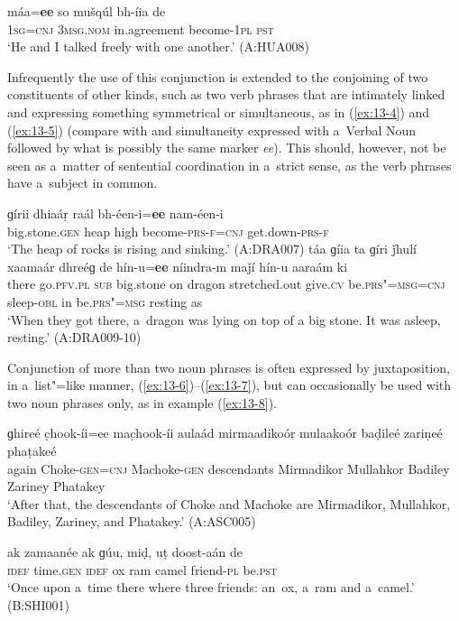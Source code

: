 \ex
\label{ex:13-3}
\gll {\ob}máa=\textbf{ee} so{\cb} mušqúl bh-íia de  \\
\textsc{1sg}=\textsc{cnj} \textsc{3msg.nom} in.agreement become-\textsc{1pl} \textsc{pst} \\
\glt `He and I talked freely with one another.' (A:HUA008) 
\z

Infrequently the use of this conjunction is extended to the conjoining of two constituents of other kinds, such as two verb phrases that are intimately linked and expressing something symmetrical or simultaneous, as in (\ref{ex:13-4}) and (\ref{ex:13-5}) (compare with  and simultaneity expressed with a~Verbal Noun followed by what is possibly the same marker \textit{ee}). This should, however, not be seen as a~matter of sentential coordination in a~strict sense, as the verb phrases have a~subject in common.

\ea
\label{ex:13-4}
\gll ɡírii dhiaáṛ {\ob}raál bh-éen-i=\textbf{ee} nam-éen-i{\cb}  \\
big.stone.\textsc{gen} heap high become-\textsc{prs-f=cnj} get.down-\textsc{prs-f}  \\
\glt `The heap of rocks is rising and sinking.' (A:DRA007) 
\ex
\label{ex:13-5}
\gll táa ɡíia ta ɡíri ǰhulí xaamaár {\ob}dhreéɡ de hín-u=\textbf{ee} níindra-m maǰí hín-u{\cb} aaraám ki\\
there go.\textsc{pfv.pl} \textsc{sub} big.stone on dragon stretched.out  give.\textsc{cv} be.\textsc{prs"=msg=cnj} sleep-\textsc{obl} in be.\textsc{prs"=msg}  resting as\\
\glt `When they got there, a~dragon was lying on top of a big stone. It was asleep, resting.' (A:DRA009-10) 
\z

 Conjunction of more than two noun phrases is often expressed by juxtaposition, in a~list"=like manner, (\ref{ex:13-6})--(\ref{ex:13-7}), but can occasionally be used with two noun phrases only, as in example (\ref{ex:13-8}).

\ea
\label{ex:13-6}
\gll ɡhireé c̣hook-íi=ee mac̣hook-íi aulaád {\ob}mirmaadikoór mulaakoór baḍileé zariṇeé phaṭakeé{\cb}\\
again Choke-\textsc{gen=cnj} Machoke-\textsc{gen} descendants  Mirmadikor Mullahkor Badiley Zariney Phatakey \\
\glt `After that, the descendants of Choke and Machoke are Mirmadikor, Mullahkor, Badiley, Zariney, and Phatakey.' (A:ASC005)

\ex
\label{ex:13-7}
\gll ak zamaanée {\ob}ak ɡúu, miḍ, uṭ{\cb} doost-aán de \\
\textsc{idef} time.\textsc{gen} \textsc{ idef} ox ram camel friend-\textsc{pl}  be.\textsc{pst}  \\
\glt `Once upon a~time there where three friends: an~ox, a~ram and a~camel.' (B:SHI001)

